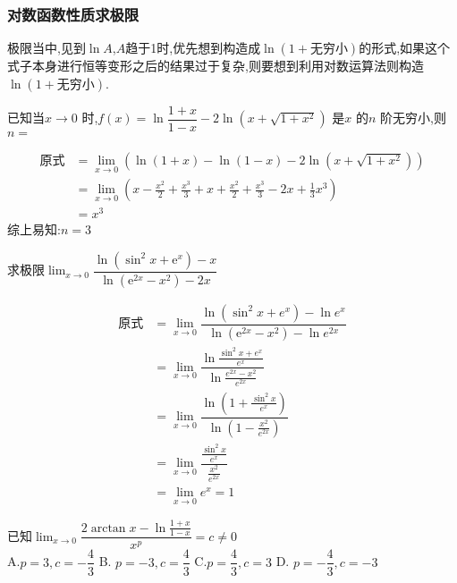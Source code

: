 \documentclass[8pt a4paper, oneside, UTF8]{ctexbook}
\begin{document}
\begin{sloppypar}
    \subsubsection{对数函数性质求极限}
    极限当中,见到$\ln A$,$A$趋于1时,优先想到构造成$\ln(1+\text{无穷小})$的形式,如果这个式子本身进行恒等变形之后的结果过于复杂,则要想到利用对数运算法则构造 $\ln(1+\text{无穷小})$.
    \begin{problem}
        已知当$x\to0$ 时,$f(x)=\ln\dfrac{1+x}{1-x}-2\ln(x+\sqrt{1+x^2})$ 是$x$ 的$n$ 阶无穷小,则$n=$
    \end{problem}
    \begin{solution}
        \begin{align*}
          \text{原式} & =\lim_{x\to 0} (\ln(1+x)-\ln(1-x)-2\ln(x+\sqrt{1+x^2}))\\
          & =  \lim_{x\to0} (x-\frac{x^2}{2}+\frac{x^3}{3}+x+\frac{x^2}{2}+\frac{x^3}{3}-2x+\frac{1}{3}x^3)\\
          & = x^3
        \end{align*}
        综上易知:$n=3$
    \end{solution}
    \begin{problem}
        求极限$\lim_{x\to0}\dfrac{\ln(\sin^2x+\mathrm{e}^x)-x}{\ln(\mathrm{e}^{2x}-x^2)-2x}$
    \end{problem}
    \begin{solution}
        \begin{align*}
            \text{原式} & = \lim_{x\to0}\dfrac{\ln(\sin^2 x+e^x)-\ln e^x}{\ln(\mathrm{e}^{2x}-x^2)-\ln e^{2x}}\\
            & =\lim_{x\to0} \dfrac{\ln \frac{\sin^2 x+e^x}{e^x}}{\ln\frac{e^{2x}-x^2}{e^{2x}}}\\
            & = \lim_{x \to 0} \dfrac{\ln (1+\frac{\sin ^2 x}{e^x})}{\ln (1-\frac{x^2}{e^{2x}})}\\
            & =\lim_{x \to 0} \dfrac{\frac{\sin^2 x}{e^x}}{\frac{x^2}{e^{2x}}}\\
            & =\lim_{x \to 0} e^x=1
        \end{align*}
    \end{solution}
    \begin{problem}
        已知$\lim_{x\to 0}\dfrac{2\arctan x-\ln\frac{1+x}{1-x}}{x^p}=c \neq 0$\\
        A.$p=3,c=-\dfrac43$ \qquad B. $p=-3,c=\dfrac{4}{3}$ \qquad C.$p=\dfrac{4}{3},c=3$ \qquad D. $p= - \dfrac 43,c= - 3$
    \end{problem}
    \begin{solution}

\end{solution}
\end{sloppypar}
\end{document}
